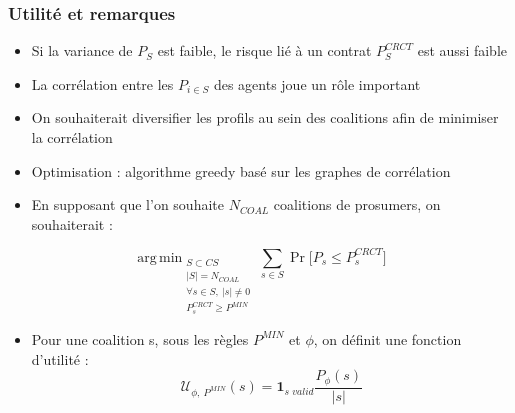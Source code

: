 \documentclass[xcolor=dvipsnames]{beamer}
\DeclareMathOperator*{\argmin}{arg\,min}
\begin{document}
%
%
\begin{frame}
	\frametitle{Utilité et remarques}

\begin{itemize}
\item Si la variance de $ P_S $ est faible, le risque lié à un contrat $ P_S^{CRCT} $ est aussi faible
\item La corrélation entre les $ P_{i \in S} $ des agents joue un rôle important
\item On souhaiterait diversifier les profils au sein des coalitions afin de minimiser la corrélation
\item Optimisation : algorithme greedy basé sur les graphes de corrélation
\item En supposant que l'on souhaite $ N_{COAL} $ coalitions de prosumers, on souhaiterait :
\end{itemize}
\[
\argmin_{\substack{ S \subset CS \\ 
                      |S| = N_{COAL} \\ 
                      \forall s \in S,\ |s| \neq 0  \\ 
                      P_{s}^{CRCT} \geq P^{MIN}}}
\sum_{s \in S}  \Pr \bigl[ P_{s} \leq P_{s}^{CRCT} \bigr]
\] 
\begin{itemize}
\item Pour une coalition s, sous les règles $ P^{MIN} $ et $ \phi $, on définit une fonction d'utilité :
\[ \mathcal{U}_{\phi,\ P^{MIN}}(s) = \mathbf{1}_{\textit{s\ valid}} \dfrac{P_{\phi}(s)}{|s|}  \]
\end{itemize}
\end{frame}
\end{document}
